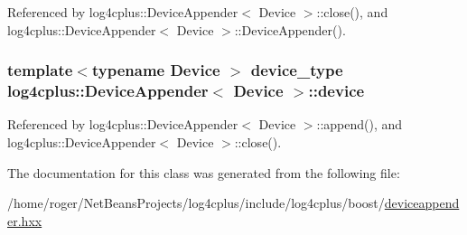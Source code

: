 Referenced by log4cplus\-::\-Device\-Appender$<$ Device $>$\-::close(), and log4cplus\-::\-Device\-Appender$<$ Device $>$\-::\-Device\-Appender().

\hypertarget{classlog4cplus_1_1DeviceAppender_a24c1cf2ab4b9718d12bcab4c10b55efa}{
\subsubsection[{device}]{\setlength{\rightskip}{0pt plus 5cm}template$<$typename Device $>$ {\bf device\-\_\-type} {\bf log4cplus\-::\-Device\-Appender}$<$ Device $>$\-::device\hspace{0.3cm}{\ttfamily [protected]}}}\label{classlog4cplus_1_1DeviceAppender_a24c1cf2ab4b9718d12bcab4c10b55efa}


Referenced by log4cplus\-::\-Device\-Appender$<$ Device $>$\-::append(), and log4cplus\-::\-Device\-Appender$<$ Device $>$\-::close().



The documentation for this class was generated from the following file\-:\begin{DoxyCompactItemize}
\item 
/home/roger/\-Net\-Beans\-Projects/log4cplus/include/log4cplus/boost/\hyperlink{deviceappender_8hxx}{deviceappender.\-hxx}\end{DoxyCompactItemize}

